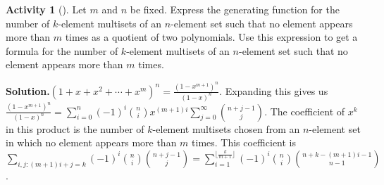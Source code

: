 \documentclass[10pt,]{book}
\theoremstyle{plain}
\theoremstyle{definition}
\newtheorem{activity}[project]{Activity}
\numberwithin{equation}{chapter}
\begin{document}
\begin{activity}[]\label{activity-217}
Let \(m\) and \(n\) be fixed. Express the generating function for the number of \(k\)-element multisets of an \(n\)-element set such that no element appears more than \(m\) times as a quotient of two polynomials. Use this expression to get a formula for the number of \(k\)-element multisets of an \(n\)-element set such that no element appears more than \(m\) times.%
\par\medskip\noindent%
\textbf{Solution.}\quad \((1+x+x^2+\cdots+x^m)^n=\frac{(1-x^{m+1})^n}{(1-x)^n}\).  Expanding this gives us \(\frac{(1-x^{m+1})^n}{(1-x)^n}=\sum_{i=0}^n(-1)^i \binom{n}{i}x^{(m+1)i} \sum_{j=0}^\infty \binom{n+j-1}{j}\). The coefficient of \(x^k\) in this product is the number of \(k\)-element multisets chosen from an \(n\)-element set in which no element appears more than \(m\) times. This coefficient is \(\sum\limits_{i,j:(m+1)i+j=k}(-1)^i\binom{n}{i}\binom{n+j-1}{j}=\sum\limits_{i=1}^{\lfloor\frac{k}{m+1}\rfloor}(-1)^i\binom{n}{i}\binom{n+k-(m+1)i-1}{n-1}\).%
\end{activity}
\end{document}
